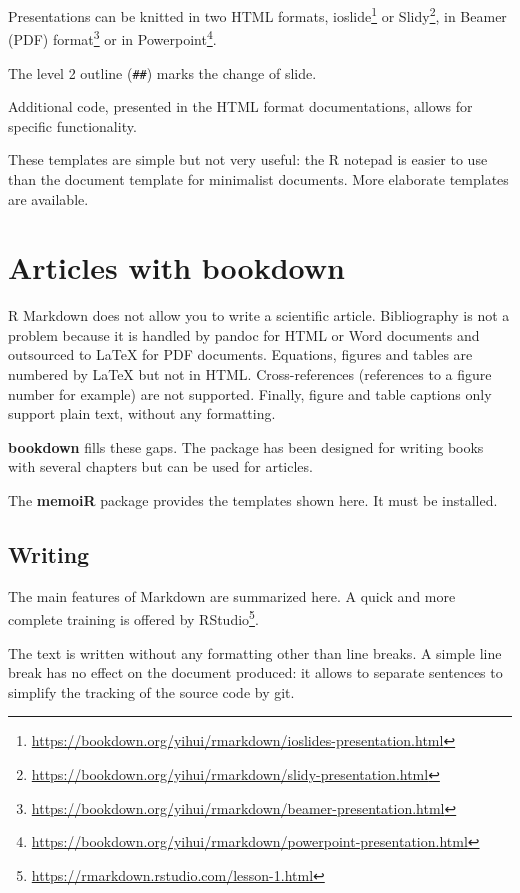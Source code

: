 \documentclass[
  12pt,
  american,
  a4paper,
  extrafontsizes,onecolumn,openright
  ]{memoir}
\begin{document}
Presentations can be knitted in two HTML formats, ioslide\footnote{\url{https://bookdown.org/yihui/rmarkdown/ioslides-presentation.html}} or Slidy\footnote{\url{https://bookdown.org/yihui/rmarkdown/slidy-presentation.html}}, in Beamer (PDF) format\footnote{\url{https://bookdown.org/yihui/rmarkdown/beamer-presentation.html}} or in Powerpoint\footnote{\url{https://bookdown.org/yihui/rmarkdown/powerpoint-presentation.html}}.

The level 2 outline (\texttt{\#\#}) marks the change of slide.

Additional code, presented in the HTML format documentations, allows for specific functionality.

These templates are simple but not very useful: the R notepad is easier to use than the document template for minimalist documents.
More elaborate templates are available.

\hypertarget{articles-with-bookdown}{%
\section{Articles with bookdown}\label{articles-with-bookdown}}

R Markdown does not allow you to write a scientific article.
Bibliography is not a problem because it is handled by pandoc for HTML or Word documents and outsourced to LaTeX for PDF documents.
Equations, figures and tables are numbered by LaTeX but not in HTML.
Cross-references (references to a figure number for example) are not supported.
Finally, figure and table captions only support plain text, without any formatting.

\textbf{bookdown} fills these gaps.
The package has been designed for writing books with several chapters but can be used for articles.

The \textbf{memoiR} package provides the templates shown here.
It must be installed.

\hypertarget{writing}{%
\subsection{Writing}\label{writing}}

The main features of Markdown are summarized here.
A quick and more complete training is offered by RStudio\footnote{\url{https://rmarkdown.rstudio.com/lesson-1.html}}.

The text is written without any formatting other than line breaks.
A simple line break has no effect on the document produced: it allows to separate sentences to simplify the tracking of the source code by git.
\end{document}
